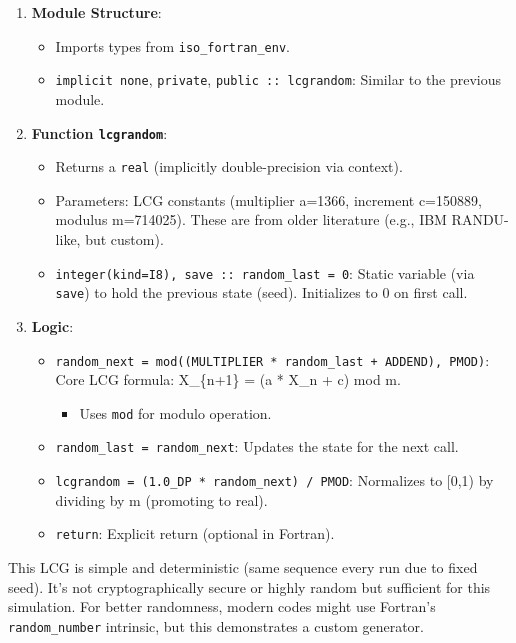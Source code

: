 \begin{enumerate}
\item \textbf{Module Structure}:

\begin{itemize}
\item Imports types from \texttt{iso\_fortran\_env}.
\item \texttt{implicit none}, \texttt{private}, \texttt{public :: lcgrandom}: Similar to the previous module.
\end{itemize}


\item \textbf{Function \texttt{lcgrandom}}:

\begin{itemize}
\item Returns a \texttt{real} (implicitly double-precision via context).
\item Parameters: LCG constants (multiplier a=1366, increment c=150889, modulus m=714025). These are from older literature (e.g., IBM RANDU-like, but custom).
\item \texttt{integer(kind=I8), save :: random\_last = 0}: Static variable (via \texttt{save}) to hold the previous state (seed). Initializes to 0 on first call.
\end{itemize}


\item \textbf{Logic}:

\begin{itemize}
\item \texttt{random\_next = mod((MULTIPLIER * random\_last + ADDEND), PMOD)}: Core LCG formula: X\_\{n+1\} = (a * X\_n + c) mod m.

\begin{itemize}
\item Uses \texttt{mod} for modulo operation.
\end{itemize}


\item \texttt{random\_last = random\_next}: Updates the state for the next call.
\item \texttt{lcgrandom = (1.0\_DP * random\_next) / PMOD}: Normalizes to [0,1) by dividing by m (promoting to real).
\item \texttt{return}: Explicit return (optional in Fortran).
\end{itemize}
\end{enumerate}

This LCG is simple and deterministic (same sequence every run due to fixed seed). It's not cryptographically secure or highly random but sufficient for this simulation. For better randomness, modern codes might use Fortran's \texttt{random\_number} intrinsic, but this demonstrates a custom generator.

